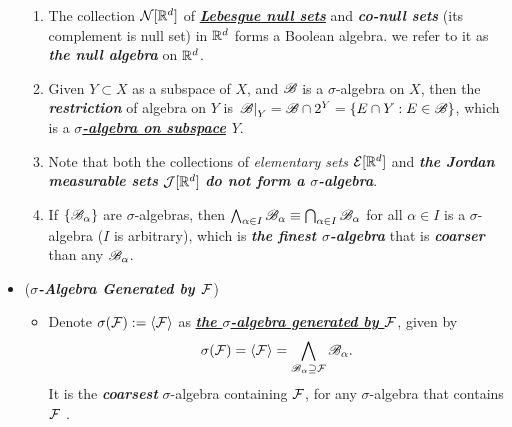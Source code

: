 \documentclass[11pt]{article}
\begin{document}
\begin{itemize}
\begin{example}
\begin{enumerate}
\item The collection ${\mathcal N}[{\mathbb R}^{d}]$ of \underline{\emph{\textbf{Lebesgue null sets}}} and \emph{\textbf{co-null sets}} (its complement is null set) in ${\mathbb R}^{d}$ forms a Boolean algebra. we refer to it as \emph{\textbf{the null algebra}} on ${\mathbb R}^d$.

\item  Given $Y\subset X$ as a subspace of $X$, and ${\mathscr B}$ is a  $\sigma$-algebra on $X$, then the \emph{\textbf{restriction}} of algebra on $Y$ is 
$\left.{{\mathscr B}}\right\vert_{Y} = {\mathscr B} \cap 2^Y = \left\{E\cap Y: E\in {\mathscr B}\right\}$, which is a \emph{\textbf{\underline{$\sigma$-algebra on subspace} $Y$}}.


\item Note that both the collections of \emph{elementary sets} ${\mathcal E}[{\mathbb R}^{d}]$ and \emph{\textbf{the Jordan measurable sets}} $\mathcal{J}[{\mathbb R}^{d}]$ \emph{\textbf{do not form a $\sigma$-algebra}}.


\item If $\{{\mathscr B}_{\alpha}\}$ are $\sigma$-algebras, then \underline{$\bigwedge_{\alpha\in I}{\mathscr B}_{\alpha}\equiv \bigcap_{\alpha\in I}{\mathscr B}_{\alpha}$} for all $\alpha\in I$ is a  $\sigma$-algebra ($I$ is arbitrary), which is \emph{\textbf{the finest $\sigma$-algebra}} that is \emph{\textbf{coarser}} than any ${\mathscr B}_{\alpha}$.  
\end{enumerate}
\end{example}


\item  \begin{example} (\emph{\textbf{$\sigma$-Algebra Generated by ${\mathcal F}$}})
\begin{itemize}
\item \begin{definition}
Denote $\sigma({\mathcal F}) := \langle {\mathcal F} \rangle$ as  \underline{\emph{\textbf{the $\sigma$-algebra generated by ${\mathcal F}$}}}, given by 
\begin{align*}
\sigma({\mathcal F}) = \langle {\mathcal F} \rangle = \bigwedge_{{\mathscr B}_{\alpha} \supseteq {\mathcal F}}{\mathscr B}_{\alpha}.
\end{align*}
 It is the  \emph{\textbf{coarsest}} $\sigma$-algebra containing ${\mathcal F}$, for any $\sigma$-algebra that contains ${\mathcal F}$  . 
\end{definition}


\end{itemize}
\end{example}
\end{itemize}
\end{document}
